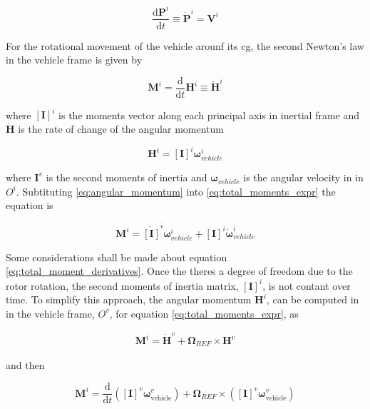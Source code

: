 \begin{equation}
    \frac{\mathrm{d}\mathbf{P}^i}{\mathrm{d}t} \equiv \dot{\mathbf{P}}^i = \mathbf{V}^i
    \label{eq:navigation_coordinates}
\end{equation}

For the rotational movement of the vehicle arounf its \gls{cg}, the second Newton's law in the vehicle frame is given by

\begin{equation}
    \mathbf{M}^i =  \frac{\mathrm{d}}{\mathrm{d}t}\mathbf{H}^i \equiv \dot{\mathbf{H}}^i
    \label{eq:total_moments_expr}
\end{equation}

where $\left[\mathbf{I}\right]^i$ is the moments vector  along each principal axis in inertial frame and $\dot{\mathbf{H}}$ is the rate of change of the angular momentum 

\begin{equation}
    \mathbf{H}^i = \left[\mathbf{I}\right]^i \boldsymbol{\omega}_{vehicle}^i
    \label{eq:angular_momentum}
\end{equation}

where $\mathbf{I}^v$ is the second moments of inertia and $\boldsymbol{\omega}_{vehicle}$ is the angular velocity in in $O^i$. Subtituting \ref{eq:angular_momentum} into \ref{eq:total_moments_expr} the equation is


\begin{equation}
    \mathbf{M}^i =  \dot{\left[\mathbf{I}\right]}^i \boldsymbol{\omega}_{vehicle}^i + \left[\mathbf{I}\right]^i\dot{\boldsymbol{\omega}}_{vehicle}^i
    \label{eq:total_moment_derivatives}
\end{equation}

Some considerations shall be made about equation \ref{eq:total_moment_derivatives}. Once the theres a degree of freedom due to the rotor rotation, the second moments of inertia matrix, $\left[\mathbf{I}\right]^i$, is not contant over time. To simplify this approach, the angular momentum $\mathbf{H}^i$, can be computed in in the vehicle frame, $O^v$, for equation \ref{eq:total_moments_expr}, as

\begin{eqnarray}
    \mathbf{M}^i =  \dot{\mathbf{H}}^v + \boldsymbol{\Omega}_{REF} \times \mathbf{H}^v
\end{eqnarray}

and then

\begin{equation}
    \mathbf{M}^i = \frac{\mathrm{d}}{\mathrm{d}t} \left(\left[\mathbf{I}\right]^v \boldsymbol{\omega}_{\text{vehicle}}^v\right) + \boldsymbol{\Omega}_{REF} \times \left(\left[\mathbf{I}\right]^v \boldsymbol{\omega}_{\text{vehicle}}^v\right)
\end{equation}


